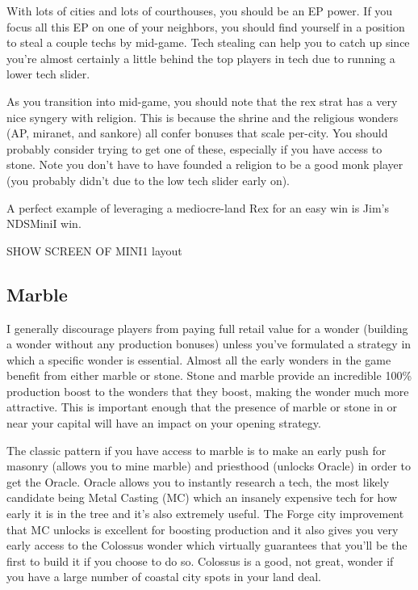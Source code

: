 \documentclass[10pt]{article}
\begin{document}
With lots of cities and lots of courthouses, you should be an EP power. If you focus all this EP on one of your neighbors, you should
find yourself in a position to steal a couple techs by mid-game. Tech stealing can help you to catch up since you're almost certainly
a little behind the top players in tech due to running a lower tech slider.

As you transition into mid-game, you should note that the rex strat has a very nice syngery with religion. This is because
the shrine and the religious wonders (AP, miranet, and sankore) all confer bonuses that scale per-city. You should probably consider
trying to get one of these, especially if you have access to stone. Note you don't have to have founded a religion to
be a good monk player (you probably didn't due to the low tech slider early on).

A perfect example of leveraging a mediocre-land Rex for an easy win is Jim's NDSMiniI win.

SHOW SCREEN OF MINI1 layout

\subsection*{Marble}

I generally discourage players from paying full retail value for a wonder (building a wonder without
any production bonuses) unless you've formulated a strategy in which a specific wonder is essential.
Almost all the early wonders in the game benefit from either marble or stone. Stone and marble provide
an incredible 100\% production boost to the wonders that they boost, making the wonder much more
attractive. This is important enough that the presence of marble or stone in or near your capital
will have an impact on your opening strategy.

The classic pattern if you have access to marble is to make an early push for masonry (allows you to mine marble)
and priesthood (unlocks Oracle) in order to get the Oracle. Oracle allows you to instantly research a tech, the most
likely candidate being Metal Casting (MC) which an insanely expensive tech for how early it is in the tree and it's also
extremely useful. The Forge city improvement that MC unlocks is excellent for boosting production and it also
gives you very early access to the Colossus wonder which virtually guarantees that you'll be the first to build it if
you choose to do so. Colossus is a good, not great, wonder if you have a large number of coastal city spots in your
land deal.
\end{document}
